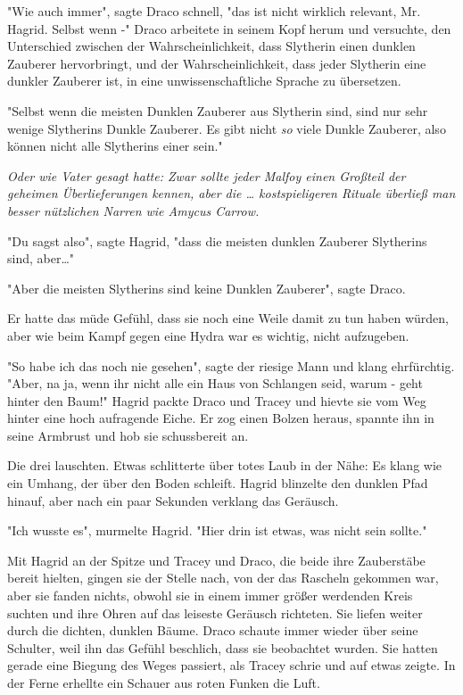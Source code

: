 {"Wie auch immer", sagte Draco schnell, "das ist nicht wirklich relevant, Mr. Hagrid. Selbst wenn -" Draco arbeitete in seinem Kopf herum und versuchte, den Unterschied zwischen der Wahrscheinlichkeit, dass Slytherin einen dunklen Zauberer hervorbringt, und der Wahrscheinlichkeit, dass jeder Slytherin eine dunkler Zauberer ist, in eine unwissenschaftliche Sprache zu übersetzen.

"Selbst wenn die meisten Dunklen Zauberer aus Slytherin sind, sind nur sehr wenige Slytherins Dunkle Zauberer. Es gibt nicht \emph{so} viele Dunkle Zauberer, also können nicht alle Slytherins einer sein."

\emph{Oder wie Vater gesagt hatte: Zwar sollte jeder Malfoy einen Großteil der geheimen Überlieferungen kennen, aber die … kostspieligeren Rituale überließ man besser nützlichen Narren wie Amycus Carrow.}

"Du sagst also", sagte Hagrid, "dass die meisten dunklen Zauberer Slytherins sind, aber…"

"Aber die meisten Slytherins sind keine Dunklen Zauberer", sagte Draco.

Er hatte das müde Gefühl, dass sie noch eine Weile damit zu tun haben würden, aber wie beim Kampf gegen eine Hydra war es wichtig, nicht aufzugeben.

"So habe ich das noch nie gesehen", sagte der riesige Mann und klang ehrfürchtig. "Aber, na ja, wenn ihr nicht alle ein Haus von Schlangen seid, warum - geht hinter den Baum!" Hagrid packte Draco und Tracey und hievte sie vom Weg hinter eine hoch aufragende Eiche. Er zog einen Bolzen heraus, spannte ihn in seine Armbrust und hob sie schussbereit an.

Die drei lauschten. Etwas schlitterte über totes Laub in der Nähe: Es klang wie ein Umhang, der über den Boden schleift. Hagrid blinzelte den dunklen Pfad hinauf, aber nach ein paar Sekunden verklang das Geräusch.

"Ich wusste es", murmelte Hagrid. "Hier drin ist etwas, was nicht sein sollte."

Mit Hagrid an der Spitze und Tracey und Draco, die beide ihre Zauberstäbe bereit hielten, gingen sie der Stelle nach, von der das Rascheln gekommen war, aber sie fanden nichts, obwohl sie in einem immer größer werdenden Kreis suchten und ihre Ohren auf das leiseste Geräusch richteten. Sie liefen weiter durch die dichten, dunklen Bäume. Draco schaute immer wieder über seine Schulter, weil ihn das Gefühl beschlich, dass sie beobachtet wurden. Sie hatten gerade eine Biegung des Weges passiert, als Tracey schrie und auf etwas zeigte. In der Ferne erhellte ein Schauer aus roten Funken die Luft.

}
